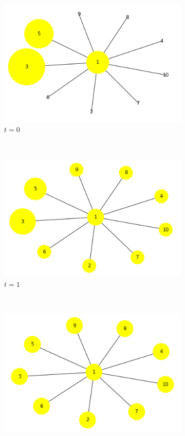 \documentclass[10pt,a4paper]{article}
\begin{document}
\begin{figure}[!h]
	\centering
	\begin{subfigure}[b]{0.38\textwidth}
		\includegraphics[width=\textwidth]{images/star-t-0.png}
		\caption{$t=0$}
		\label{t0}
	\end{subfigure}~
	\begin{subfigure}[b]{0.38\textwidth}
		\includegraphics[width= \textwidth]{images/star-t-1.png}
		\caption{$t=1$}
		\label{t1}
	\end{subfigure}\\
	\begin{subfigure}[b]{0.38\textwidth}
		\includegraphics[width=\textwidth]{images/star-t-6.png}

\end{subfigure}
\end{figure}
\end{document}
